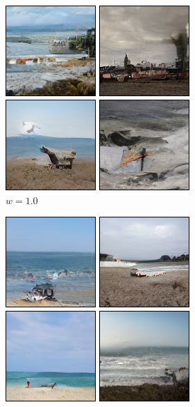 \documentclass[11pt,a4paper]{article}
\begin{document}
\begin{figure}[!ht]
    \centering
    \begin{subfigure}[b]{0.24\textwidth}
    \includegraphics[width=\linewidth]{figures/a_beach_1.png}
    \caption{$w=1.0$}
    \end{subfigure}
    \begin{subfigure}[b]{0.24\textwidth}
    \includegraphics[width=\linewidth]{figures/a_beach_3.png}

\end{subfigure}
\end{figure}
\end{document}
